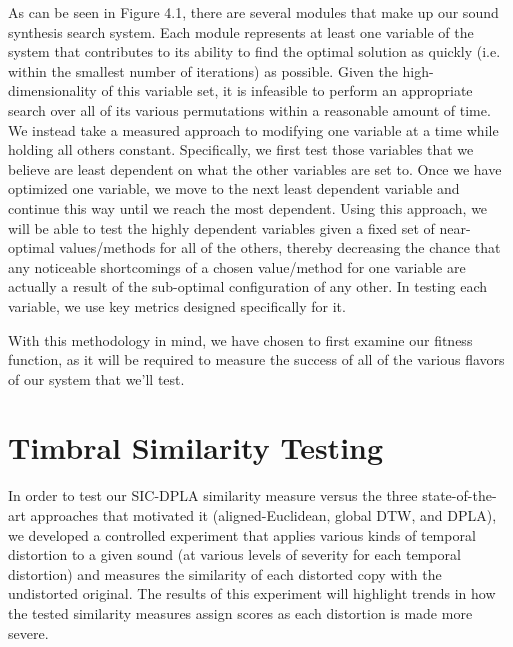\documentclass[12pt]{report} 	%
\numberwithin{figure}{chapter}
\numberwithin{table}{chapter}
\numberwithin{equation}{chapter}
\begin{document}
\begin{flushleft}
As can be seen in Figure 4.1, there are several modules that make up our sound synthesis search system. Each module represents at least one variable of the system that contributes to its ability to find the optimal solution as quickly (i.e. within the smallest number of iterations) as possible. Given the high-dimensionality of this variable set, it is infeasible to perform an appropriate search over all of its various permutations within a reasonable amount of time. We instead take a measured approach to modifying one variable at a time while holding all others constant. Specifically, we first test those variables that we believe are least dependent on what the other variables are set to. Once we have optimized one variable, we move to the next least dependent variable and continue this way until we reach the most dependent. Using this approach, we will be able to test the highly dependent variables given a fixed set of near-optimal values/methods for all of the others, thereby decreasing the chance that any noticeable shortcomings of a chosen value/method for one variable are actually a result of the sub-optimal configuration of any other. In testing each variable, we use key metrics designed specifically for it.

With this methodology in mind, we have chosen to first examine our fitness function, as it will be required to measure the success of all of the various flavors of our system that we'll test.

\section{Timbral Similarity Testing}
In order to test our SIC-DPLA similarity measure versus the three state-of-the-art approaches that motivated it (aligned-Euclidean, global DTW, and DPLA), we developed a controlled experiment that applies various kinds of temporal distortion to a given sound (at various levels of severity for each temporal distortion) and measures the similarity of each distorted copy with the undistorted original. The results of this experiment will highlight trends in how the tested similarity measures assign scores as each distortion is made more severe.


\end{flushleft}
\end{document}
